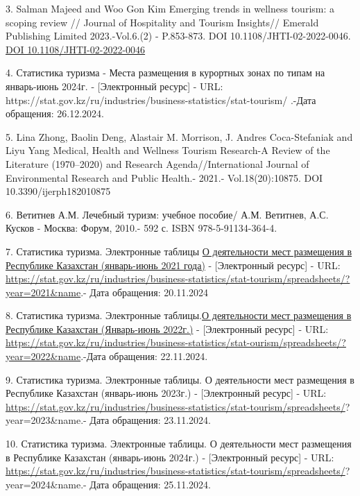 3. Salman Majeed and Woo Gon Kim Emerging trends in wellness tourism: a
scoping review // Journal of Hospitality and Tourism Insights// Emerald
Publishing Limited 2023.-Vol.6.(2) - P.853-873. DOI
10.1108/JHTI-02-2022-0046.
\href{https://doi.org/10.1108/JHTI-02-2022-0046}{DOI
10.1108/JHTI-02-2022-0046}

4. Статистика туризма - Места размещения в курортных зонах по типам на
январь-июнь 2024г. - {[}Электронный ресурс{]} - URL:
https://stat.gov.kz/ru/industries/business-statistics/stat-tourism/
.-Дата обращения: 26.12.2024.

5. Lina Zhong, Baolin Deng, Alastair M. Morrison, J. Andres
Coca-Stefaniak and Liyu Yang Medical, Health and Wellness Tourism
Research-A Review of the Literature (1970--2020) and Research
Agenda//International Journal of Environmental Research and Public
Health.- 2021.- Vol.18(20):10875. DOI 10.3390/ijerph182010875

6. Ветитнев А.М. Лечебный туризм: учебное пособие/ А.М. Ветитнев, А.С.
Кусков - Москва: Форум, 2010.- 592 с. ISBN 978-5-91134-364-4.

7. Статистика туризма. Электронные таблицы
\href{https://stat.gov.kz/api/iblock/element/26608/file/ru/}{О
деятельности мест размещения в Республике Казахстан (январь-июнь 2021
года)} - {[}Электронный ресурс{]} - URL:
\url{https://stat.gov.kz/ru/industries/business-statistics/stat-tourism/spreadsheets/?year=2021&name}.-
Дата обращения: 20.11.2024

8. Статистика туризма. Электронные
таблицы.\href{https://stat.gov.kz/api/iblock/element/4430/file/ru/}{О
деятельности мест размещения в Республике Казахстан (Январь-июнь
2022г.)} - {[}Электронный ресурс{]} - URL:
\url{https://stat.gov.kz/ru/industries/business-statistics/stat-ourism/spreadsheets/?year=2022&name}.-Дата
обращения: 22.11.2024.

9. Статистика туризма. Электронные таблицы. О деятельности мест
размещения в Республике Казахстан (январь-июнь 2023г.) - {[}Электронный
ресурс{]} - URL:
\url{https://stat.gov.kz/ru/industries/business-statistics/stat-tourism/spreadsheets/}?year=2023\&name.-
Дата обращения: 23.11.2024.

10. Статистика туризма. Электронные таблицы. О деятельности мест
размещения в Республике Казахстан (январь-июнь 2024г.) - {[}Электронный
ресурс{]} - URL:
\url{https://stat.gov.kz/ru/industries/business-statistics/stat-tourism/}\href{https://stat.gov.kz/ru/industries/business-statistics/stat-tourism/spreadsheets/}{spreadsheets/}?year=2024\&name.-
Дата обращения: 25.11.2024.


